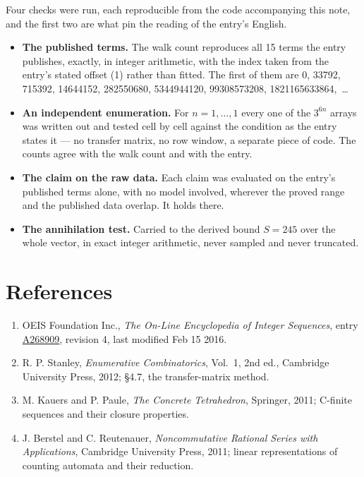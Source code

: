 \documentclass[11pt]{article}
\theoremstyle{definition}
\begin{document}
Four checks were run, each reproducible from the code accompanying this note, and the first two are what pin the reading of the entry's English.

\begin{itemize}

\item {\bfseries The published terms.} The walk count reproduces all 15 terms the entry publishes, exactly, in integer arithmetic, with the index taken from the entry's stated offset (1) rather than fitted. The first of them are 0, 33792, 715392, 14644152, 282550680, 5344944120, 99308573208, 1821165633864,~\dots

\item {\bfseries An independent enumeration.} For $n = 1,\dots,1$ every one of the $3^{6n}$ arrays was written out and tested cell by cell against the condition as the entry states it --- no transfer matrix, no row window, a separate piece of code. The counts agree with the walk count and with the entry.

\item {\bfseries The claim on the raw data.} Each claim was evaluated on the entry's published terms alone, with no model involved, wherever the proved range and the published data overlap. It holds there.

\item {\bfseries The annihilation test.} Carried to the derived bound $S = 245$ over the whole vector, in exact integer arithmetic, never sampled and never truncated.

\end{itemize}

\section{References}

\begin{enumerate}

\item OEIS Foundation Inc., \emph{The On-Line Encyclopedia of Integer Sequences}, entry \href{https://oeis.org/A268909}{A268909}, revision 4, last modified Feb 15 2016.

\item R. P. Stanley, \emph{Enumerative Combinatorics}, Vol.~1, 2nd ed., Cambridge University Press, 2012; \S4.7, the transfer-matrix method.

\item M. Kauers and P. Paule, \emph{The Concrete Tetrahedron}, Springer, 2011; C-finite sequences and their closure properties.

\item J. Berstel and C. Reutenauer, \emph{Noncommutative Rational Series with Applications}, Cambridge University Press, 2011; linear representations of counting automata and their reduction.

\end{enumerate}
\end{document}
